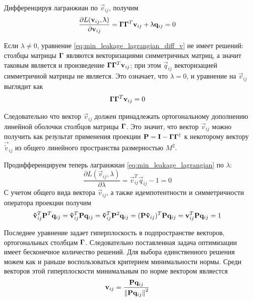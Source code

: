 Дифференцируя лагранжиан по $\vec{v}_{ij}$, получим
\begin{equation}
    \frac{\partial L(\mathbf{v}_{ij}, \uplambda)}{\partial \mathbf{v}_{ij}} = \mathbf{\Gamma} \mathbf{\Gamma}^T\mathbf{v}_{ij} + \uplambda \mathbf{q}_{ij} = 0
    \label{eq:min_leakage_lagrangian_diff_v}
\end{equation}

Если $\lambda \neq 0$, уравнение \ref{eq:min_leakage_lagrangian_diff_v} не имеет решений:
столбцы матрицы $\mathbf{\Gamma}$ являются векторизациями симметричных матриц, а
значит таковым является и произведение $\mathbf{\Gamma} \mathbf{\Gamma}^T\mathbf{v}_{ij}$; при этом
$\vec{q}_{ij}$ векторизацией симметричной матрицы не является. Это означает, что $\lambda = 0$,
и уравнение на $\vec{v}_{ij}$ выглядит как 
\begin{equation}
    \mathbf{\Gamma} \mathbf{\Gamma}^T\mathbf{v}_{ij} = 0
\end{equation}

Следовательно что вектор $\vec{v}_{ij}$ должен принадлежать ортогональному
дополнению линейной оболочки столбцов матрицы $\mathbf{\Gamma}$. Это значит, что
вектор $\vec{v}_{ij}$ можно получить как результат применения проекции
$\mathbf{P} = \mathbf{I} - \mathbf{\Gamma} \mathbf{\Gamma} ^ {\dagger}$
к некоторому вектору $\vec{\tilde{v}}_{ij}$ из общего линейного пространства размерностью $M^2$.

Продифференцируем теперь лагранжиан \ref{eq:min_leakage_lagrangian} по $\lambda$:
\begin{equation}
    \frac{\partial L(\vec{v}_{ij}, \lambda)}{\partial \lambda} = \vec{v}_{ij}^T \vec{q}_{ij} - 1 = 0
    \label{eq:min_leakage_lagrangian_diff_lambda}
\end{equation}
С учетом общего вида вектора $\vec{v}_{ij}$, а также идемпотентности и
симметричности оператора проекции получим
\begin{equation}
    \mathbf{\tilde{v}}_{ij}^T \mathbf{P}^T \mathbf{q}_{ij} = 
    \mathbf{\tilde{v}}_{ij}^T \mathbf{P} \mathbf{q}_{ij} =
    \mathbf{\tilde{v}}_{ij}^T \mathbf{P}^2 \mathbf{q}_{ij} =
    (\mathbf{P}\mathbf{\tilde{v}}_{ij})^T \mathbf{P} \mathbf{q}_{ij} =
    \mathbf{v}_{ij}^T \mathbf{P} \mathbf{q}_{ij} = 1
\end{equation}

Последнее уравнение задает гиперплоскость в подпространстве векторов, ортогональных
столбцам $\mathbf{\Gamma}$. Следовательно поставленная задача оптимизации имеет бесконечное
количество решений. Для выбора единственного решения можем как и раньше воспользоваться
критерием минимальности нормы.
Среди векторов этой гиперплоскости минимальным по норме вектором
являестся
\begin{equation}
    \mathbf{v}_{ij} = \frac{\mathbf{P} \mathbf{q}_{ij} } { \left\lVert\mathbf{P} \mathbf{q}_{ij}\right\rVert^2 }
    \label{eq:min_leakage_solution}
\end{equation}

